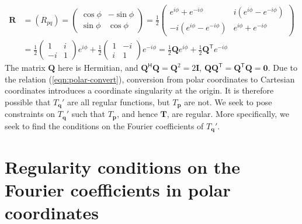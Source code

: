 \documentclass[a4paper, 11pt]{article}
\begin{document}
\begin{equation}\label{eqn:transform-matrix}
\begin{aligned}
    \mathbf{R} &= \left(R_{pq}\right) = 
    \begin{pmatrix}
        \cos\phi & -\sin\phi \\ 
        \sin\phi & \cos\phi 
    \end{pmatrix} = \frac{1}{2} \begin{pmatrix}
        e^{i\phi} + e^{-i\phi} & i \left(e^{i\phi} - e^{-i\phi}\right) \\ 
        -i \left(e^{i\phi} - e^{-i\phi}\right) & e^{i\phi} + e^{-i\phi}
    \end{pmatrix} \\ 
    &= \frac{1}{2} \begin{pmatrix} 1 & i \\ -i & 1 \end{pmatrix} e^{i\phi} + 
    \frac{1}{2} \begin{pmatrix} 1 & -i \\ i & 1 \end{pmatrix} e^{-i\phi} = \frac{1}{2} \mathbf{Q} e^{i\phi} + \frac{1}{2} \mathbf{Q}^\mathsf{T} e^{-i\phi}
\end{aligned}
\end{equation}
The matrix $\mathbf{Q}$ here is Hermitian, and $\mathbf{Q}^\mathsf{H} \mathbf{Q} = \mathbf{Q}^2 = 2\mathbf{I}$, $\mathbf{Q}\mathbf{Q}^\mathsf{T} = \mathbf{Q}^\mathsf{T} \mathbf{Q} = \mathbf{0}$. Due to the relation (\ref{eqn:polar-convert}), conversion from polar coordinates to Cartesian coordinates introduces a coordinate singularity at the origin. It is therefore possible that $T_\mathbf{q}'$ are all regular functions, but $T_\mathbf{p}$ are not. We seek to pose constraints on $T_\mathbf{q}'$ such that $T_{\mathbf{p}}$, and hence $\mathbf{T}$, are regular. More specifically, we seek to find the conditions on the Fourier coefficients of $T_\mathbf{q}'$.


\section{Regularity conditions on the Fourier coefficients in polar coordinates}
\end{document}
